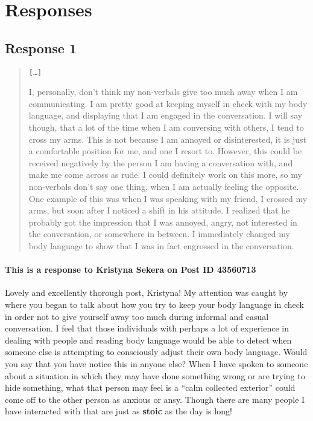 
\section{Responses}
  \subsection{Response 1}
    \begin{quotation}
      \texttt{[\ldots]}

      I, personally, don’t think my non-verbals give too much away when I am
        communicating. I am pretty good at keeping myself in check with my body
        language, and displaying that I am engaged in the conversation. I will
        say though, that a lot of the time when I am conversing with others, I
        tend to cross my arms. This is not because I am annoyed or
        disinterested, it is just a comfortable position for me, and one I
        resort to. However, this could be received negatively by the person I
        am having a conversation with, and make me come across as rude. I could
        definitely work on this more, so my non-verbals don’t say one thing,
        when I am actually feeling the opposite. One example of this was when I
        was speaking with my friend, I crossed my arms, but soon after I noticed
        a shift in his attitude. I realized that he probably got the impression
        that I was annoyed, angry, not interested in the conversation, or
        somewhere in between. I immediately changed my body language to show
        that I was in fact engrossed in the conversation.
    \end{quotation}

    \paragraph{This is a response to Kristyna Sekera on Post ID 43560713}
      Lovely and excellently thorough post, Kristyna! My attention was caught
        by where you began to talk about how you try to keep your body language
        in check in order not to give yourself away too much during informal
        and casual conversation. I feel that those individuals with perhaps a
        lot of experience in dealing with people and reading body language
        would be able to detect when someone else is attempting to consciously
        adjust their own body language. Would you say that you have notice this
        in anyone else? When I have spoken to someone about a situation in which
        they may have done something wrong or are trying to hide something, what
        that person may feel is a ``calm collected exterior'' could come off
        to the other person as anxious or ansy. Though there are many people
        I have interacted with that are just as \textbf{stoic} as the day
        is long!
